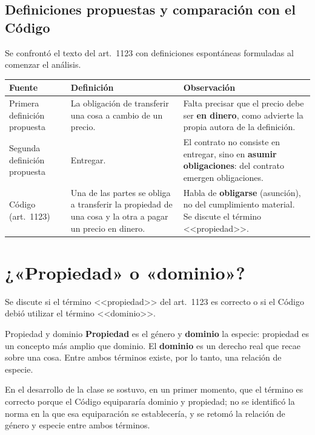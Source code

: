 \documentclass[12pt,oneside]{book}
\begin{document}
\subsection{Definiciones propuestas y comparación con el Código}

Se confrontó el texto del art.~1123 con definiciones espontáneas formuladas al comenzar el análisis.

\begin{table}[H]
\centering
\small
\begin{tabularx}{\textwidth}{>{\raggedright\arraybackslash}p{} >{\raggedright\arraybackslash}X >{\raggedright\arraybackslash}X}
\toprule
\textbf{Fuente} & \textbf{Definición} & \textbf{Observación} \\
\midrule
Primera definición propuesta &
La obligación de transferir una cosa a cambio de un precio. &
Falta precisar que el precio debe ser \textbf{en dinero}, como advierte la propia autora de la definición. \\

Segunda definición propuesta &
Entregar. &
El contrato no consiste en entregar, sino en \textbf{asumir obligaciones}: del contrato emergen obligaciones. \\

Código (art.~1123) &
Una de las partes se obliga a transferir la propiedad de una cosa y la otra a pagar un precio en dinero. &
Habla de \textbf{obligarse} (asunción), no del cumplimiento material. Se discute el término <<propiedad>>. \\
\bottomrule
\end{tabularx}
\end{table}

\section{¿«Propiedad» o «dominio»?}

Se discute si el término <<propiedad>> del art.~1123 es correcto o si el Código debió utilizar el término <<dominio>>.

\begin{definition}{Propiedad y dominio}
\textbf{Propiedad} es el género y \textbf{dominio} la especie: propiedad es un concepto más amplio que dominio. El \textbf{dominio} es un derecho real que recae sobre una cosa. Entre ambos términos existe, por lo tanto, una relación de especie.
\end{definition}

En el desarrollo de la clase se sostuvo, en un primer momento, que el término es correcto porque el Código equipararía dominio y propiedad; no se identificó la norma en la que esa equiparación se establecería, y se retomó la relación de género y especie entre ambos términos.
\end{document}
